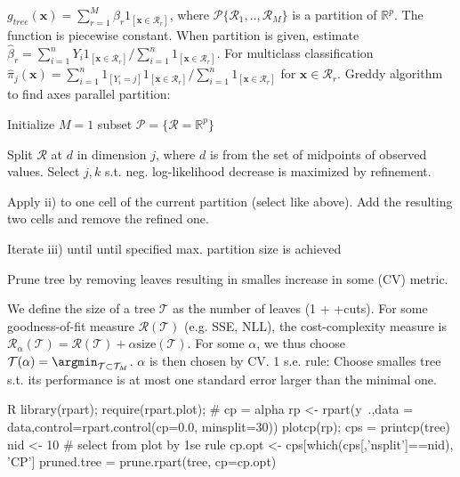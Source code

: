 \begin{sectionbox}\nospacing{}
$g_{tree}(\mathbf{x}) = \sum_{r=1}^{M}\beta_r 1_{[\mathbf{x}\in \mathcal{R}_r]}$, where $\mathcal{P} \{\mathcal{R}_1,.., \mathcal{R}_M\}$ is a partition of $\mathbb{R}^p$. The function is piecewise constant. When partition is given, estimate $\hat{\beta}_r = \sum_{i=1}^{n}Y_i 1_{[\mathbf{x}\in \mathcal{R}_r]}/\sum_{i=1}^{n}1_{[\mathbf{x}\in \mathcal{R}_r]}$. For multiclass classification $\hat{\pi}_j(\mathbf{x}) = \sum_{i=1}^{n}1_{[Y_i =j]} 1_{[\mathbf{x}\in \mathcal{R}_r]}/\sum_{i=1}^{n}1_{[\mathbf{x}\in \mathcal{R}_r]}$ for $\mathbf{x} \in \mathcal{R}_r$. Greddy algorithm to find axes parallel partition:
\begin{enumeratenosep}[label=\roman*]
	\item Initialize $M=1$ subset $\mathcal{P} = \{\mathcal{R} = \mathbb{R}^p\}$
	\item Split $\mathcal{R}$ at $d$ in dimension $j$, where $d$ is from the set of midpoints of observed values. Select $j,k$ s.t. neg. log-likelihood decrease is maximized by refinement.
	\item Apply ii) to one cell of the current partition (select like above). Add the resulting two cells and remove the refined one. 
	\item Iterate iii) until until specified max. partition size is achieved
	\item Prune tree by removing leaves resulting in smalles increase in some (CV) metric.
\end{enumeratenosep}
We define the size of a tree $\mathcal{T}$ as the number of leaves (1 + +cuts). For some goodness-of-fit measure $\mathcal{R}(\mathcal{T})$ (e.g. SSE, NLL), the cost-complexity measure is $\mathcal{R}_{\alpha}(\mathcal{T})=\mathcal{R}(\mathcal{T}) + \alpha \text{size}(\mathcal{T}) $. For some $\alpha$, we thus choose $\mathcal{T}(\alpha) = \argmin_{\mathcal{T}\subset\mathcal{T}_M}$. $\alpha$ is then chosen by CV. 1 s.e. rule: Choose smalles tree s.t. its performance is at most one standard error larger than the minimal one. 

\begin{mintlinebox}{R}
library(rpart); require(rpart.plot); 
# cp = alpha
rp <- rpart(y~.,data = data,control=rpart.control(cp=0.0, minsplit=30))
plotcp(rp); cps = printcp(tree)
nid <- 10 # select from plot by 1se rule
cp.opt <- cps[which(cps[,'nsplit']==nid), 'CP']
pruned.tree = prune.rpart(tree, cp=cp.opt)
\end{mintlinebox}
\end{sectionbox}


